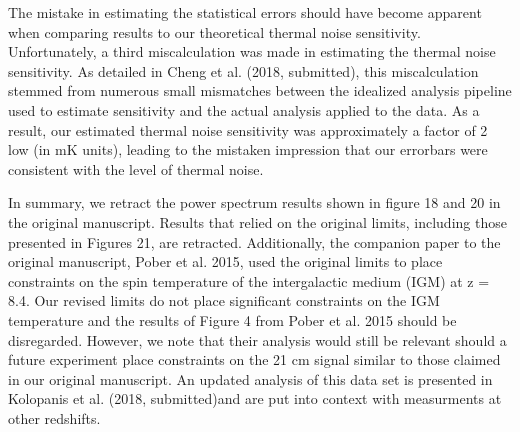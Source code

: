 \documentclass[onecolumn]{emulateapj} \shorttitle{}
\newcommand{\hMpci}{h\ {\rm Mpc}^{-1}}
\newcommand{\kolopaniscitet}{Kolopanis et al. (2018, submitted)}
\newcommand{\chengcitet}{\textrm{Cheng et al. (2018, submitted)}}
\begin{document}
The mistake in estimating the statistical errors should have become apparent when comparing results to our theoretical
thermal noise sensitivity.  Unfortunately, a third miscalculation was made in estimating the thermal noise sensitivity.
As detailed in \chengcitet, this miscalculation stemmed from numerous small mismatches between the idealized analysis
pipeline used to estimate sensitivity and the actual analysis applied to the data.  As a result, our estimated thermal
noise sensitivity was approximately a factor of 2 low (in $\textrm{mK}$ units), leading to the mistaken impression that our
errorbars were consistent with the level of thermal noise.

In summary, we retract the power spectrum results shown in figure 18 and 20 in the original manuscript.
Results that relied on the original limits, including those presented in Figures 21,
are retracted.  Additionally, the companion paper to the original manuscript,
Pober et al. 2015, used the original limits to place constraints on the spin
temperature of the intergalactic medium (IGM) at z = 8.4.  Our revised limits
do not place significant constraints on the IGM temperature and the results of
Figure 4 from Pober et al. 2015 should be disregarded.  However, we note that
their analysis would still be relevant should a future experiment place
constraints on the 21 cm signal similar to those claimed in our original
manuscript.
An updated analysis of this data set is presented in \kolopaniscitet and are put into context with measurments at other 
redshifts.


\nocite{*}


\end{document}
